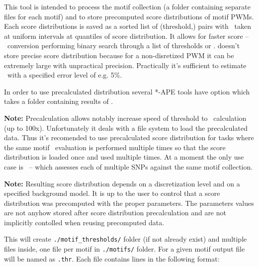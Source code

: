 This tool is intended to process the motif collection (a folder containing separate
files for each motif) and to store precomputed score distributions of motif PWMs. Each score distributions is saved as a sorted list of \mbox{(threshold,\pvalue)} pairs with \pvalues\ taken at uniform intervals at quantiles of score distribution. It allows for faster score -- \pvalue\ conversion performing binary search through a list of thresholds or \pvalues.  doesn't store precise score distribution because for a non-disretized PWM it can be extremely large with unpractical precision. Practically it's sufficient to estimate \pvalue\ with a specified error level of e.g. 5\%.

In order to use precalculated distribution several *-APE tools have  option which takes a folder containing results of .

\textbf{Note:} Precalculation allows notably increase speed of threshold to \pvalue\ calculation (up to 100x). Unfortunately it deals with a file system to load the precalculated data. Thus it's recomended to use precalculated score distribution for tasks where the same motif \pvalue\ evaluation is performed multiple times so that the score distribution is loaded once and used multiple times. At a moment the only use case is ~--  which assesses each of multiple SNPs against the same motif collection.

\textbf{Note:} Resulting score distribution depends on a discretization level and on a specified background model. It is up to the user to control that a score distribution was precomputed with the proper parameters. The parameters values are not anyhow stored after score distribution precalculation and are not implicitly contolled when reusing precomputed data.

\usageheader
{}

\example{}

This will create \texttt{./motif\_thresholds/} folder (if not already exist) and multiple files inside, one file per motif in \texttt{./motifs/} folder. For a given motif output file will be named as \texttt{.thr}.
Each file contains lines in the following format:

